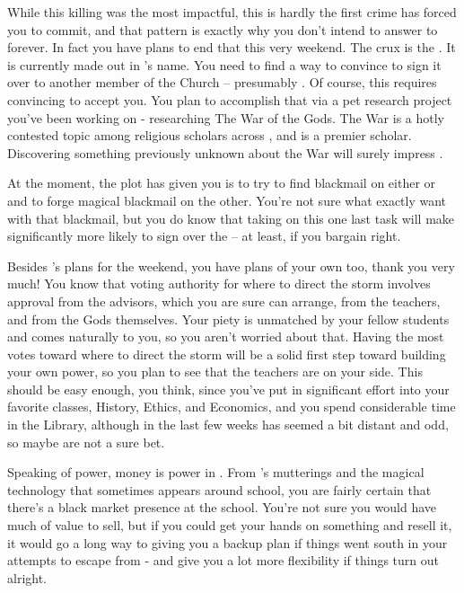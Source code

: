 \documentclass[char]{GL2020}
\begin{document}
While this killing was the most impactful, this is hardly the first crime \cAntiChup{} has forced you to commit, and that pattern is exactly why you don’t intend to answer to \cAntiChup{} forever. In fact you have plans to end that this very weekend. The crux is the \iScholarship{}. It is currently made out in \cAntiChup{}’s name. You need to find a way to convince \cAntiChup{} to sign it over to another member of the Church -- presumably \cBeetle{}. Of course, this requires convincing \cBeetle{} to accept you. You plan to accomplish that via a pet research project you’ve been working on - researching The War of the Gods. The War is a hotly contested topic among religious scholars across \pEarth{}, and \cBeetle{} is a premier scholar. Discovering something previously unknown about the War will surely impress \cBeetle{\them}.

At the moment, the plot \cAntiChup{} has given you is to try to find blackmail on either \cInitiate{} or \cPirate{} and to forge magical blackmail on the other. You’re not sure what exactly \cAntiChup{\they} want\cAntiChup{\plural} with that blackmail, but you do know that taking on this one last task will make \cAntiChup{} significantly more likely to sign over the \iScholarship{} -- at least, if you bargain right.

Besides \cAntiChup{}’s plans for the weekend, you have plans of your own too, thank you very much! You know that voting authority for where to direct the storm involves approval from the advisors, which you are sure \cAntiChup{} can arrange, from the teachers, and from the Gods themselves. Your piety is unmatched by your fellow students and comes naturally to you, so you aren’t worried about that. Having the most votes toward where to direct the storm will be a solid first step toward building your own power, so you plan to see that the teachers are on your side.  This should be easy enough, you think, since you’ve put in significant effort into your favorite classes, History, Ethics, and Economics, and you spend considerable time in the Library, although in the last few weeks \cLibrarian{} has seemed a bit distant and odd, so maybe \cLibrarian{\they} are not a sure bet.

Speaking of power, money is power in \pTech{}. From \cAntiChup{}’s mutterings and the magical technology that sometimes appears around school, you are fairly certain that there’s a black market presence at the school. You’re not sure you would have much of value to sell, but if you could get your hands on something and resell it, it would go a long way to giving you a backup plan if things went south in your attempts to escape from \cAntiChup{} - and give you a lot more flexibility if things turn out alright.
\end{document}
